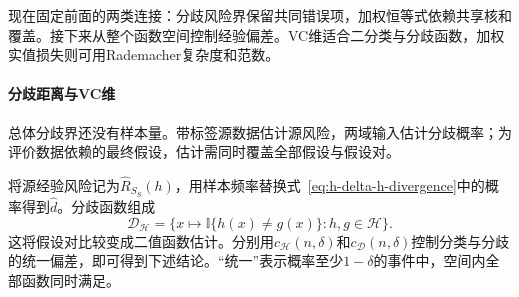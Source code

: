 现在固定前面的两类连接：分歧风险界保留共同错误项，加权恒等式依赖共享核和覆盖。接下来从整个函数空间控制经验偏差。VC维适合二分类与分歧函数，加权实值损失则可用Rademacher复杂度和范数。

\paragraph{分歧距离与VC维}

总体分歧界还没有样本量。带标签源数据估计源风险，两域输入估计分歧概率；为评价数据依赖的最终假设，估计需同时覆盖全部假设与假设对。

将源经验风险记为$\widehat R_{S_S}(h)$，用样本频率替换式~\eqref{eq:h-delta-h-divergence}中的概率得到$\widehat d$。分歧函数组成
\[
 \mathcal D_{\mathcal H}
 =\{x\mapsto\mathbb I\{h(x)\neq g(x)\}:h,g\in\mathcal H\}.
\]
这将假设对比较变成二值函数估计。分别用$c_{\mathcal H}(n,\delta)$和$c_{\mathcal D}(n,\delta)$控制分类与分歧的统一偏差，即可得到下述结论。“统一”表示概率至少$1-\delta$的事件中，空间内全部函数同时满足。

